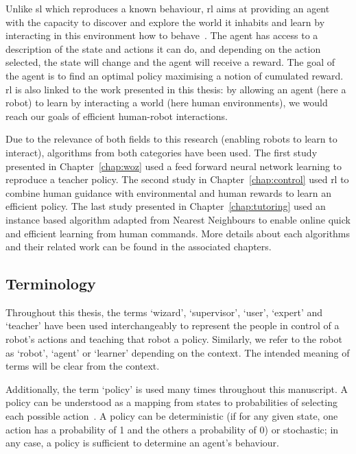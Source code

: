 Unlike \gls{sl} which reproduces a known behaviour, \gls{rl} aims at providing an agent with the capacity to discover and explore the world it inhabits and learn by interacting in this environment how to behave~\citep{sutton1998reinforcement}. The agent has access to a description of the state and actions it can do, and depending on the action selected, the state will change and the agent will receive a reward. The goal of the agent is to find an optimal policy maximising a notion of cumulated reward. \gls{rl} is also linked to the work presented in this thesis: by allowing an agent (here a robot) to learn by interacting a world (here human environments), we would reach our goals of efficient human-robot interactions.

Due to the relevance of both fields to this research (enabling robots to learn to interact), algorithms from both categories have been used. The first study presented in Chapter~\ref{chap:woz} used a feed forward neural network learning to reproduce a teacher policy. The second study in Chapter~\ref{chap:control} used \gls{rl} to combine human guidance with environmental and human rewards to learn an efficient policy. The last study presented in Chapter~\ref{chap:tutoring} used an instance based algorithm adapted from Nearest Neighbours to enable online quick and efficient learning from human commands. More details about each algorithms and their related work can be found in the associated chapters.

\subsection{Terminology}

Throughout this thesis, the terms `wizard', `supervisor', `user', `expert' and `teacher' have been used interchangeably to represent the people in control of a robot's actions and teaching that robot a policy. Similarly, we refer to the robot as `robot', `agent' or `learner' depending on the context. The intended meaning of terms will be clear from the context.

Additionally, the term `policy' is used many times throughout this manuscript. A policy can be understood as a mapping from states to probabilities of selecting each possible action~\citep{sutton1998reinforcement}. A policy can be deterministic (if for any given state, one action has a probability of 1 and the others a probability of 0) or stochastic; in any case, a policy is sufficient to determine an agent's behaviour.

